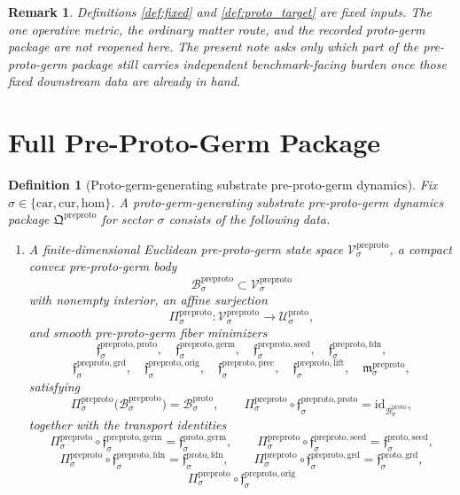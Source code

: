 \documentclass[11pt]{article}
\newcommand{\Car}{\mathrm{car}}
\newcommand{\Cur}{\mathrm{cur}}
\newcommand{\Hom}{\mathrm{hom}}
\newcommand{\ProtoSpace}[1]{\mathcal U_{#1}^{\mathrm{proto}}}
\newcommand{\ProtoBody}[1]{\mathcal B_{#1}^{\mathrm{proto}}}
\newcommand{\ProtoGermMin}[1]{\mathfrak f_{#1}^{\mathrm{proto,germ}}}
\newcommand{\ProtoSeedMin}[1]{\mathfrak f_{#1}^{\mathrm{proto,seed}}}
\newcommand{\ProtoFoundMin}[1]{\mathfrak f_{#1}^{\mathrm{proto,fdn}}}
\newcommand{\ProtoGroundMin}[1]{\mathfrak f_{#1}^{\mathrm{proto,grd}}}
\newcommand{\PreProtoPackage}{\mathfrak Q^{\mathrm{preproto}}}
\newcommand{\PreProtoSpace}[1]{\mathcal V_{#1}^{\mathrm{preproto}}}
\newcommand{\PreProtoBody}[1]{\mathcal B_{#1}^{\mathrm{preproto}}}
\newcommand{\PreProtoProj}[1]{\Pi_{#1}^{\mathrm{preproto}}}
\newcommand{\PreProtoProtoMin}[1]{\mathfrak f_{#1}^{\mathrm{preproto,proto}}}
\newcommand{\PreProtoGermMin}[1]{\mathfrak f_{#1}^{\mathrm{preproto,germ}}}
\newcommand{\PreProtoSeedMin}[1]{\mathfrak f_{#1}^{\mathrm{preproto,seed}}}
\newcommand{\PreProtoFoundMin}[1]{\mathfrak f_{#1}^{\mathrm{preproto,fdn}}}
\newcommand{\PreProtoGroundMin}[1]{\mathfrak f_{#1}^{\mathrm{preproto,grd}}}
\newcommand{\PreProtoOrigMin}[1]{\mathfrak f_{#1}^{\mathrm{preproto,orig}}}
\newcommand{\PreProtoPrecMin}[1]{\mathfrak f_{#1}^{\mathrm{preproto,prec}}}
\newcommand{\PreProtoLiftMin}[1]{\mathfrak f_{#1}^{\mathrm{preproto,lift}}}
\newcommand{\PreProtoSubMin}[1]{\mathfrak m_{#1}^{\mathrm{preproto}}}
\newtheorem{definition}{Definition}
\newtheorem{remark}{Remark}
\begin{document}
\begin{remark}
Definitions \ref{def:fixed} and \ref{def:proto_target} are fixed inputs. The one operative metric, the ordinary matter route, and the recorded proto-germ package are not reopened here. The present note asks only which part of the pre-proto-germ package still carries independent benchmark-facing burden once those fixed downstream data are already in hand.
\end{remark}

\section{Full Pre-Proto-Germ Package}

\begin{definition}[Proto-germ-generating substrate pre-proto-germ dynamics]
\label{def:preproto}
Fix \(\sigma\in\{\Car,\Cur,\Hom\}\). A proto-germ-generating substrate pre-proto-germ dynamics package \(\PreProtoPackage\) for sector \(\sigma\) consists of the following data.
\begin{enumerate}
    \item A finite-dimensional Euclidean pre-proto-germ state space \(\PreProtoSpace{\sigma}\), a compact convex pre-proto-germ body
    \[
    \PreProtoBody{\sigma}\subset\PreProtoSpace{\sigma}
    \]
    with nonempty interior, an affine surjection
    \[
    \PreProtoProj{\sigma}:\PreProtoSpace{\sigma}\to\ProtoSpace{\sigma},
    \]
    and smooth pre-proto-germ fiber minimizers
    \[
    \PreProtoProtoMin{\sigma},\quad
    \PreProtoGermMin{\sigma},\quad
    \PreProtoSeedMin{\sigma},\quad
    \PreProtoFoundMin{\sigma},
    \]
    \[
    \PreProtoGroundMin{\sigma},\quad
    \PreProtoOrigMin{\sigma},\quad
    \PreProtoPrecMin{\sigma},\quad
    \PreProtoLiftMin{\sigma},\quad
    \PreProtoSubMin{\sigma},
    \]
    satisfying
    \[
    \PreProtoProj{\sigma}\bigl(\PreProtoBody{\sigma}\bigr)=\ProtoBody{\sigma},
    \qquad
    \PreProtoProj{\sigma}\circ\PreProtoProtoMin{\sigma}
    =
    \mathrm{id}_{\ProtoBody{\sigma}},
    \]
    together with the transport identities
    \[
    \PreProtoProj{\sigma}\circ\PreProtoGermMin{\sigma}
    =
    \ProtoGermMin{\sigma},
    \qquad
    \PreProtoProj{\sigma}\circ\PreProtoSeedMin{\sigma}
    =
    \ProtoSeedMin{\sigma},
    \]
    \[
    \PreProtoProj{\sigma}\circ\PreProtoFoundMin{\sigma}
    =
    \ProtoFoundMin{\sigma},
    \qquad
    \PreProtoProj{\sigma}\circ\PreProtoGroundMin{\sigma}
    =
    \ProtoGroundMin{\sigma},
    \]
    \[
    \PreProtoProj{\sigma}\circ\PreProtoOrigMin{\sigma}
\]
\end{enumerate}
\end{definition}
\end{document}
